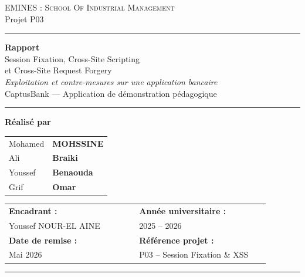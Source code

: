 \documentclass[12pt,a4paper]{report}
\begin{document}
\begin{titlepage}
\centering

{\large\scshape EMINES : School Of Industrial Management}\\[0.3cm]
{\normalsize Projet P03}

\vspace{1cm}
\rule{\linewidth}{0.4pt}

\vspace{1.8cm}

{\LARGE\bfseries Rapport}\\[0.6cm]
{\Large Session Fixation, Cross-Site Scripting}\\[0.2cm]
{\Large et Cross-Site Request Forgery}\\[0.8cm]
{\large\itshape Exploitation et contre-mesures sur une application bancaire}\\[0.3cm]
{\normalsize\textcolor{comment-gray}{CaptusBank — Application de démonstration pédagogique}}

\vspace{1.2cm}
\rule{\linewidth}{0.4pt}

\vspace{2cm}

{\normalsize\bfseries Réalisé par}\\[0.6cm]
\begin{tabular}{ll}
  Mohamed & \textbf{MOHSSINE} \\[4pt]
  Ali     & \textbf{Braiki}   \\[4pt]
  Youssef & \textbf{Benaouda} \\[4pt]
  Grif    & \textbf{Omar}     \\
\end{tabular}

\vfill

\begin{tabular}{@{}p{0.45\linewidth}p{0.45\linewidth}@{}}
  \textbf{Encadrant :} & \textbf{Année universitaire :} \\
  Youssef NOUR-EL AINE     & 2025 -- 2026 \\[6pt]
  \textbf{Date de remise :} & \textbf{Référence projet :} \\
  Mai 2026             & P03 -- Session Fixation \& XSS \\
\end{tabular}

\vspace{0.8cm}
\rule{\linewidth}{0.4pt}

\end{titlepage}
\end{document}
